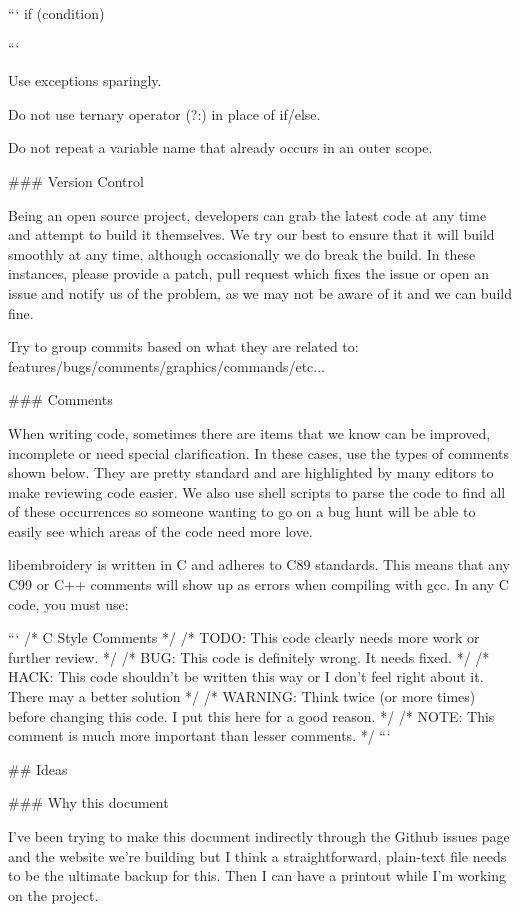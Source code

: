 ```
if (condition) {

}
```

Use exceptions sparingly.

Do not use ternary operator (?:) in place of if/else.

Do not repeat a variable name that already occurs in an outer scope.

### Version Control

Being an open source project, developers can grab the latest code at any
time and attempt to build it themselves. We try our best to ensure that
it will build smoothly at any time, although occasionally we do break
the build. In these instances, please provide a patch, pull request
which fixes the issue or open an issue and notify us of the problem, as
we may not be aware of it and we can build fine.

Try to group commits based on what they are related to:
features/bugs/comments/graphics/commands/etc...

### Comments

When writing code, sometimes there are items that we know can be
improved, incomplete or need special clarification. In these cases, use
the types of comments shown below. They are pretty standard and are
highlighted by many editors to make reviewing code easier. We also use
shell scripts to parse the code to find all of these occurrences so
someone wanting to go on a bug hunt will be able to easily see which
areas of the code need more love.

libembroidery is written in C and adheres to C89 standards. This means
that any C99 or C++ comments will show up as errors when compiling with
gcc. In any C code, you must use:

```
/* C Style Comments */
/* TODO: This code clearly needs more work or further review. */
/* BUG: This code is definitely wrong. It needs fixed. */
/* HACK: This code shouldn't be written this way or I don't feel right about it. There may a better solution */
/* WARNING: Think twice (or more times) before changing this code. I put this here for a good reason. */
/* NOTE: This comment is much more important than lesser comments. */
```

## Ideas

### Why this document

I've been trying to make this document indirectly through the Github
issues page and the website we're building but I think a
straightforward, plain-text file needs to be the ultimate backup for
this. Then I can have a printout while I'm working on the project.

